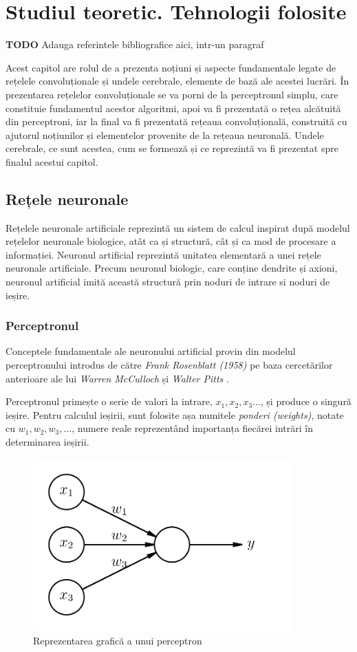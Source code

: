 \chapter{Studiul teoretic. Tehnologii folosite}\label{ch:2studiu_teoretic}
\textbf{TODO} Adauga referintele bibliografice aici, intr-un paragraf \cite{neuralnetbook:2015}

Acest capitol are rolul de a prezenta noțiuni și aspecte fundamentale legate de rețelele convoluționale și undele cerebrale, elemente de bază ale acestei lucrări. În prezentarea rețelelor convoluționale se va porni de la perceptronul simplu, care constituie fundamentul acestor algoritmi, apoi va fi prezentată o rețea alcătuită din perceptroni, iar la final va fi prezentată rețeaua convoluțională, construită cu ajutorul noțiunilor și elementelor provenite de la rețeaua neuronală. Undele cerebrale, ce sunt acestea, cum se formează și ce reprezintă va fi prezentat spre finalul acestui capitol.

\section{Rețele neuronale}
Rețelele neuronale artificiale reprezintă un sistem de calcul inspirat după modelul rețelelor neuronale biologice, atât ca și structură, cât și ca mod de procesare a informației. Neuronul artificial reprezintă unitatea elementară a unei rețele neuronale artificiale. Precum neuronul biologic, care conține dendrite și axioni, neuronul artificial imită această structură prin noduri de intrare si noduri de ieșire.
\subsection{Perceptronul}
Conceptele fundamentale ale neuronului artificial provin din modelul perceptronului introdus de către \textit{Frank Rosenblatt (1958)} \cite{rosenblatt1962principles} pe baza cercetărilor anterioare ale lui \textit{Warren McCulloch} și \textit{Walter Pitts} \cite{McCulloch:427611}.

Perceptronul primește o serie de valori la intrare, $x_1, x_2, x_3\dots$, și produce o singură ieșire. Pentru calculul ieșirii, sunt folosite așa numitele \textit{ponderi (weights)}, notate cu $w_1, w_2, w_3,\dots$, numere reale reprezentând importanța fiecărei intrări în determinarea ieșirii.
\begin{figure}[ht]
\centering
\includegraphics[width=10cm, keepaspectratio]{fig/cap2/perceptron.png}
\caption{Reprezentarea grafică a unui perceptron}
\end{figure}

